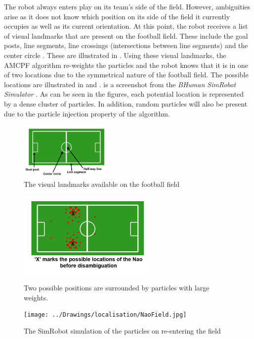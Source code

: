 The robot always enters play on its team's side of the field. However, ambiguities arise as it does not know which position on its side of the field it currently occupies as well as its current orientation. At this point, the robot receives a list of visual landmarks that are present on the football field. These include the goal posts, line segments, line crossings (intersections between line segments) and the center circle \citep{Bhuman}. These are illustrated in . Using these visual landmarks, the AMCPF algorithm re-weights the particles and the robot knows that it is in one of two locations due to the symmetrical nature of the football field. The possible locations are illustrated in  and .  is a screenshot from the \textit{BHuman SimRobot Simulator} \citep{Bhuman}. As can be seen in the figures, each potential location is represented by a dense cluster of particles. In addition, random particles will also be present due to the particle injection property of the algorithm.\\

\begin{figure}[ht!]
  \centering
    \includegraphics[width=0.4\textwidth]{../Drawings/localisation/goalSetup.jpg}
    \caption{The visual landmarks available on the football field} 
    \label{fig:localiseLandmarks}
\end{figure}

\begin{figure}[ht!]
\begin{minipage}[b]{0.5\linewidth}
  \centering
    \includegraphics[width=0.6\textwidth]{../Drawings/localisation/beforeDisambiguate.jpg}
    \caption{Two possible positions are surrounded by particles with large weights.} 
    \label{fig:before}
\end{minipage}
\begin{minipage}[b]{0.5\linewidth}
  \centering
    \texttt{[image: ../Drawings/localisation/NaoField.jpg]}
    \caption{The SimRobot simulation of the particles on re-entering the field}
    \label{fig:beforeSim}
\end{minipage}
\end{figure}


